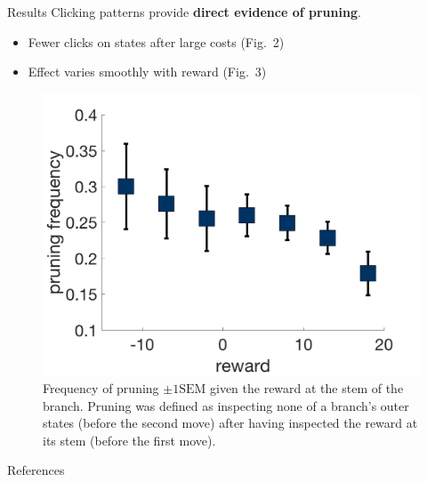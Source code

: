 \documentclass[final]{beamer}
\newlength{\onecolwid}
\begin{document}
\begin{frame}[t, fragile]
\begin{columns}[t]
\begin{column}{\onecolwid}
  \begin{block}{Results}\label{results}
    Clicking patterns provide \textbf{direct evidence of pruning}.
    \begin{itemize}
      \item Fewer clicks on states after large costs (Fig.~2)
      \item Effect varies smoothly with reward (Fig.~3)
    \end{itemize}
  \end{block}

  \begin{figure}
    \label{fig:pruning}
    \includegraphics[width=0.9\linewidth]{figs/prunning_any_noFB.png}
    \captionsetup{width=0.9\linewidth}
    \caption[first]{Frequency of pruning $\pm 1 \text{SEM}$ given the reward at the stem of the branch. Pruning was defined as inspecting none of a branch's outer states (before the second move) after having inspected the reward at its stem (before the first move).}
  \end{figure}

  \begin{block}{References}\label{references}
    
    \tiny
    
  \end{block}


    \small{}


\end{column} %

\end{columns} %

\end{frame}
\end{document}

